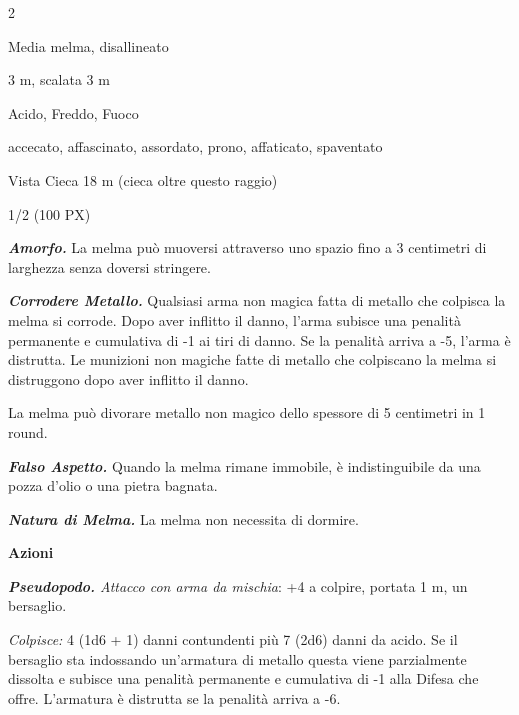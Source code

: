 \begin{multicols}{2}
{
\begin{description}[noitemsep, topsep=0pt, parsep=0pt, partopsep=0pt, itemsep=1pt, leftmargin=2.35cm,  labelwidth=2.2cm, itemindent=0cm, listparindent=0pt] %
\setlength{\baselineskip}{10pt}
\item[\textbf{Taglia/Tipo}] Media melma, disallineato
\item[\textbf{Caratt.}] 
\item[\textbf{Punti Ferita}] 
\item[\textbf{Movimento}] 3 m, scalata 3 m
\item[\textbf{Tiri Salvez.}] 
\item[\textbf{Res. Danni}] Acido, Freddo, Fuoco
\item[\textbf{Immunità}] accecato, affascinato, assordato, prono, affaticato, spaventato
\item[\textbf{Sensi}] Vista Cieca 18 m (cieca oltre questo raggio)
\item[\textbf{Sfida}] 1/2 (100 PX)
\end{description}
\smallskip

\emph{\textbf{Amorfo.}} La melma può muoversi attraverso uno spazio fino a 3 centimetri di larghezza senza doversi stringere.

\emph{\textbf{Corrodere Metallo.}} Qualsiasi arma non magica fatta di metallo che colpisca la melma si corrode. Dopo aver inflitto il danno, l'arma subisce una penalità permanente e cumulativa di -1 ai tiri di danno. Se la penalità arriva a -5, l'arma è distrutta. Le munizioni non magiche fatte di metallo che colpiscano la melma si distruggono dopo aver inflitto il danno.

La melma può divorare metallo non magico dello spessore di 5 centimetri in 1 round.

\emph{\textbf{Falso Aspetto.}} Quando la melma rimane immobile, è indistinguibile da una pozza d'olio o una pietra bagnata.

\emph{\textbf{Natura di Melma.}} La melma non necessita di dormire.

\textbf{Azioni}

\emph{\textbf{Pseudopodo.} Attacco con arma da mischia}: +4 a colpire, portata 1 m, un bersaglio.

\emph{Colpisce:} 4 (1d6 + 1) danni contundenti più 7 (2d6) danni da acido. Se il bersaglio sta indossando un'armatura di metallo questa viene parzialmente dissolta e subisce una penalità permanente e cumulativa di -1 alla Difesa che offre. L'armatura è distrutta se la penalità arriva a -6.

}
\end{multicols}
